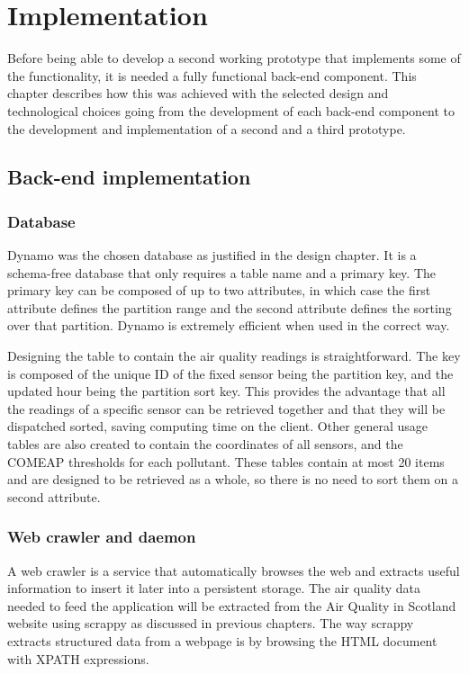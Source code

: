 \chapter{Implementation}
Before being able to develop a second working prototype that implements some of the functionality, it is needed a fully functional back-end component. This chapter describes how this was achieved with the selected design and technological choices going from the development of each back-end component to the development and implementation of a second and a third prototype.
\section{Back-end implementation}

\subsection{Database}
Dynamo was the chosen database as justified in the design chapter. It is a schema-free database that only requires a table name and a primary key. The primary key can be composed of up to two attributes, in which case the first attribute defines the partition range and the second attribute defines the sorting over that partition. Dynamo is extremely efficient when used in the correct way. 

Designing the table to contain the air quality readings is straightforward. The key is composed of the unique ID of the fixed sensor being the partition key, and the updated hour being the partition sort key. This provides the advantage that all the readings of a specific sensor can be retrieved together and that they will be dispatched sorted, saving computing time on the client. Other general usage tables are also created to contain the coordinates of all sensors, and the COMEAP thresholds for each pollutant. These tables contain at most 20 items and are designed to be retrieved as a whole, so there is no need to sort them on a second attribute.

\subsection{Web crawler and daemon}
A web crawler is a service that automatically browses the web and extracts useful information to insert it later into a persistent storage. The air quality data needed to feed the application will be extracted from the Air Quality in Scotland website using scrappy as discussed in previous chapters. The way scrappy extracts structured data from a webpage is by browsing the HTML document with XPATH expressions. 


